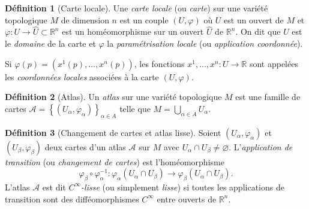 \documentclass[12pt,a4paper,openany]{book}
\theoremstyle{definition}
\newtheorem{definition}{Définition}[chapter]
\theoremstyle{plain}
\theoremstyle{remark}
\newcommand{\R}{\mathbb{R}}
\newcommand{\set}[1]{\left\{#1\right\}}
\begin{document}
\begin{definition}[Carte locale]\label{def:carte}
Une \emph{carte locale} (ou \emph{carte}) sur une variété topologique $M$ de
dimension $n$ est un couple $(U, \varphi)$ où $U$ est un ouvert de $M$ et
$\varphi \colon U \to \widehat{U} \subset \R^n$ est un homéomorphisme sur un
ouvert $\widehat{U}$ de $\R^n$. On dit que $U$ est le \emph{domaine} de la
carte et $\varphi$ la \emph{paramétrisation locale} (ou \emph{application
coordonnée}).

Si $\varphi(p) = (x^1(p), \ldots, x^n(p))$, les fonctions $x^1, \ldots, x^n
\colon U \to \R$ sont appelées les \emph{coordonnées locales} associées à la carte $(U, \varphi)$.
\end{definition}

\begin{definition}[Atlas]\label{def:atlas}
Un \emph{atlas} sur une variété topologique $M$ est une famille de cartes
$\mathcal{A} = \set{(U_\alpha, \varphi_\alpha)}_{\alpha \in A}$ telle que
$M = \bigcup_{\alpha \in A} U_\alpha$.
\end{definition}

\begin{definition}[Changement de cartes et atlas lisse]\label{def:atlas-lisse}
Soient $(U_\alpha, \varphi_\alpha)$ et $(U_\beta, \varphi_\beta)$ deux cartes
d'un atlas $\mathcal{A}$ sur $M$ avec $U_\alpha \cap U_\beta \neq \varnothing$.
L'\emph{application de transition} (ou \emph{changement de cartes}) est
l'homéomorphisme
\[
    \varphi_\beta \circ \varphi_\alpha^{-1} \colon
    \varphi_\alpha(U_\alpha \cap U_\beta) \longrightarrow
    \varphi_\beta(U_\alpha \cap U_\beta).
\]
L'atlas $\mathcal{A}$ est dit \emph{$C^\infty$-lisse} (ou simplement
\emph{lisse}) si toutes les applications de transition sont des
difféomorphismes $C^\infty$ entre ouverts de $\R^n$.
\end{definition}
\end{document}
